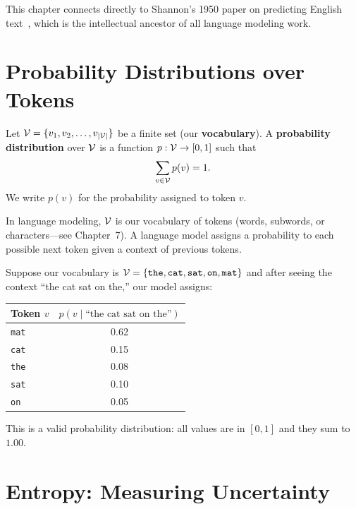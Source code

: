 This chapter connects directly to Shannon's 1950 paper on predicting English text~\parencite{shannon1950}, which is the intellectual ancestor of all language modeling work.

\section{Probability Distributions over Tokens}
\label{ch:01:sec:setup}

\begin{definition}
\label{def:01:prob_dist}
Let $\mathcal{V} = \{v_1, v_2, \ldots, v_{|\mathcal{V}|}\}$ be a finite set (our \textbf{vocabulary}). A \textbf{probability distribution} over $\mathcal{V}$ is a function $p: \mathcal{V} \to [0, 1]$ such that
\begin{equation}
\label{eq:01:prob_sum}
\sum_{v \in \mathcal{V}} p(v) = 1.
\end{equation}
We write $p(v)$ for the probability assigned to token $v$.
\end{definition}

In language modeling, $\mathcal{V}$ is our vocabulary of tokens (words, subwords, or characters---see Chapter~7). A language model assigns a probability to each possible next token given a context of previous tokens.

\begin{example}
\label{ex:01:simple_dist}
Suppose our vocabulary is $\mathcal{V} = \{\texttt{the}, \texttt{cat}, \texttt{sat}, \texttt{on}, \texttt{mat}\}$ and after seeing the context ``the cat sat on the,'' our model assigns:
\begin{center}
\begin{tabular}{lc}
\toprule
Token $v$ & $p(v \mid \text{``the cat sat on the''})$ \\
\midrule
\texttt{mat} & 0.62 \\
\texttt{cat} & 0.15 \\
\texttt{the} & 0.08 \\
\texttt{sat} & 0.10 \\
\texttt{on} & 0.05 \\
\bottomrule
\end{tabular}
\end{center}
This is a valid probability distribution: all values are in $[0,1]$ and they sum to $1.00$.
\end{example}


\section{Entropy: Measuring Uncertainty}
\label{ch:01:sec:entropy}

